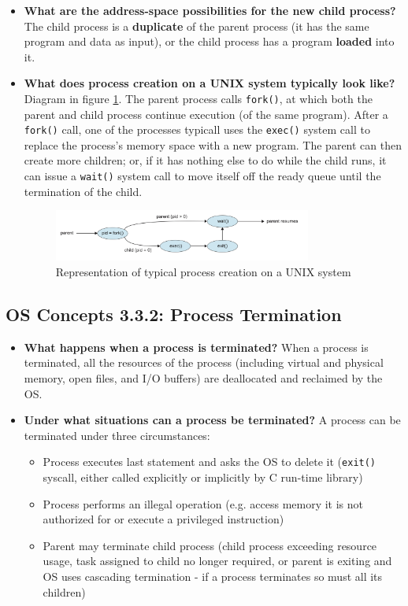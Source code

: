 \documentclass[12pt]{article}
\begin{document}
\begin{itemize}
    \item \textbf{What are the address-space possibilities for the new child process?} The child process is a \textbf{duplicate} of the parent process (it has the same program and data as input), or the child process has a program \textbf{loaded} into it.
    \item \textbf{What does process creation on a UNIX system typically look like?} Diagram in figure \ref{fig:unix-process-creation}. The parent process calls \texttt{fork()}, at which both the parent and child process continue execution (of the same program). After a \texttt{fork()} call, one of the processes typicall uses the \texttt{exec()} system call to replace the process's memory space with a new program. The parent can then create more children; or, if it has nothing else to do while the child runs, it can issue a \texttt{wait()} system call to move itself off the ready queue until the termination of the child.
        \begin{figure}[ht]
            \centering
            \includegraphics[width=0.8\textwidth]{figures/unix-process-creation.jpg}
            \caption{Representation of typical process creation on a UNIX system}
            \label{fig:unix-process-creation}
        \end{figure}
\end{itemize}

\subsection*{OS Concepts 3.3.2: Process Termination}

\begin{itemize}
    \item \textbf{What happens when a process is terminated?} When a process is terminated, all the resources of the process (including virtual and physical memory, open files, and I/O buffers) are deallocated and reclaimed by the OS.
    \item \textbf{Under what situations can a process be terminated?} A process can be terminated under three circumstances:
        \begin{itemize}
            \item Process executes last statement and asks the OS to delete it (\texttt{exit()} syscall, either called explicitly or implicitly by C run-time library)
            \item Process performs an illegal operation (e.g. access memory it is not authorized for or execute a privileged instruction)
            \item Parent may terminate child process (child process exceeding resource usage, task assigned to child no longer required, or parent is exiting and OS uses cascading termination - if a process terminates so must all its children)
        \end{itemize}
\end{itemize}
\end{document}
